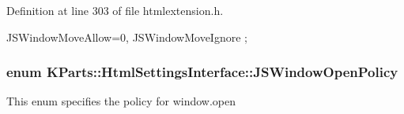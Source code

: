 \-Definition at line 303 of file htmlextension.\-h.


\begin{DoxyCode}
                            {
        JSWindowMoveAllow=0,
        JSWindowMoveIgnore
    };
\end{DoxyCode}
\hypertarget{classKParts_1_1HtmlSettingsInterface_aab245c057a7179fc1bdc16e020750643}{
\subsubsection[{\-J\-S\-Window\-Open\-Policy}]{\setlength{\rightskip}{0pt plus 5cm}enum {\bf \-K\-Parts\-::\-Html\-Settings\-Interface\-::\-J\-S\-Window\-Open\-Policy}}}\label{classKParts_1_1HtmlSettingsInterface_aab245c057a7179fc1bdc16e020750643}
\-This enum specifies the policy for window.\-open

